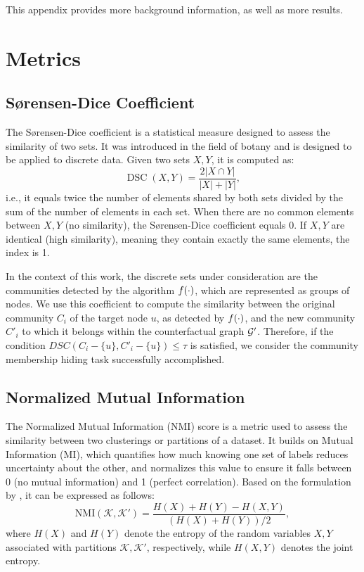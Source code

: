 This appendix provides more background information, as well as more results.


\section{Metrics}

\subsection{Sørensen-Dice Coefficient}
\label{app:dcs}

The Sørensen-Dice coefficient \cite{metrics:Dice} is a statistical measure designed to assess the similarity of two sets. It was introduced in the field of botany and is designed to be applied to discrete data. Given two sets $X,Y$, it is computed as:
\begin{equation}
    \operatorname{DSC}(X, Y) = \dfrac{2 | X \cap Y |}{|X| + |Y|},
\end{equation}
i.e., it equals twice the number of elements shared by both sets divided by the sum of the number of elements in each set. When there are no common elements between $X,Y$ (no similarity), the Sørensen-Dice coefficient equals $0$. If $X,Y$ are identical (high similarity), meaning they contain exactly the same elements, the index is 1.

In the context of this work, the discrete sets under consideration are the communities detected by the algorithm $f(\cdot)$, which are represented as groups of nodes.
We use this coefficient to compute the similarity between the original community $C_i$ of the target node $u$, as detected by $f(\cdot)$, and the new community $C'_i$ to which it belongs within the counterfactual graph $\mathcal{G}'$. Therefore, if the condition
$DSC(C_i - \{u\}, C'_i - \{u\}) \leq \tau$ is satisfied, we consider the community membership hiding task successfully accomplished.

\subsection{Normalized Mutual Information}
\label{app:nmi}
The Normalized Mutual Information (NMI) score is a metric used to assess the similarity between two clusterings or partitions of a dataset. It builds on Mutual Information (MI), which quantifies how much knowing one set of labels reduces uncertainty about the other, and normalizes this value to ensure it falls between 0 (no mutual information) and 1 (perfect correlation).
Based on the formulation by \citet{nmi_3}, it can be expressed as follows:
\begin{equation}
\label{eq:NMI}
    \text{NMI} ( \mathcal{K}, \mathcal{K}' ) = \frac{H(X) + H(Y) - H(X, Y)}{(H(X) + H(Y)) / 2},
\end{equation}
where $H(X)$ and $H(Y)$ denote the entropy of the random variables $X,Y$ associated with partitions $\mathcal{K},\mathcal{K}'$, respectively, while $H(X, Y)$ denotes the joint entropy. 

